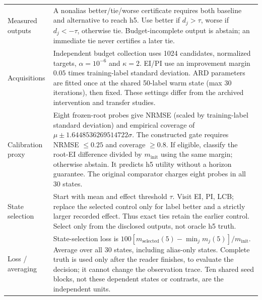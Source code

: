 \begin{longtable}{@{}>{\raggedright\arraybackslash}p{.17\linewidth}>{\raggedright\arraybackslash}p{}@{}}
Measured outputs & A nonalias better/tie/worse certificate requires both baseline and alternative to reach h5. Use better if $d_j>\tau$, worse if $d_j<-\tau$, otherwise tie. Budget-incomplete output is abstain; an immediate tie never certifies a later tie. \\
Acquisitions & Independent budget collection uses 1024 candidates, normalized targets, $\alpha=10^{-6}$ and $\kappa=2$. EI/PI use an improvement margin $0.05$ times training-label standard deviation. ARD parameters are fitted once at the shared 50-label warm state (max 30 iterations), then fixed. These settings differ from the archived intervention and transfer studies. \\
Calibration proxy & Eight frozen-root probes give NRMSE (scaled by training-label standard deviation) and empirical coverage of $\mu\pm1.6448536269514722\sigma$. The constructed gate requires NRMSE $\leq0.25$ and coverage $\geq0.8$. If eligible, classify the root-EI difference divided by $m_{\mathrm{init}}$ using the same margin; otherwise abstain. It predicts h5 utility without a horizon guarantee. The original comparator charges eight probes in all 30 states. \\
State selection & Start with mean and effect threshold $\tau$. Visit EI, PI, LCB; replace the selected control only for label better and a strictly larger recorded effect. Thus exact ties retain the earlier control. Select only from the disclosed outputs, not oracle h5 truth. \\
Loss / averaging & State-selection loss is $100[m_{\mathrm{selected}}(5)-\min_j m_j(5)]/m_{\mathrm{init}}$. Average over all 30 states, including alias-only states. Complete truth is used only after the reader finishes, to evaluate the decision; it cannot change the observation trace. Ten shared seed blocks, not these dependent states or contrasts, are the independent units. \\
\end{longtable}
\endgroup

